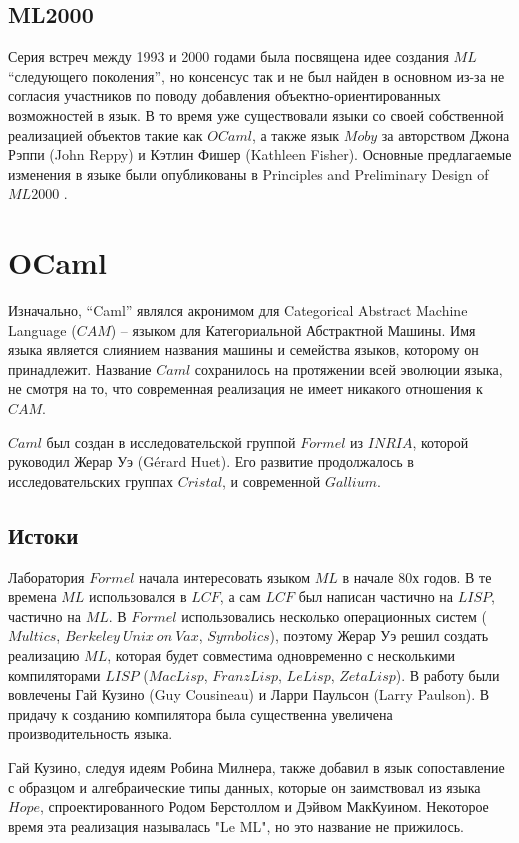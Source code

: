 \documentclass[14pt]{matmex-diploma-custom}
\begin{document}
\subsection{ML2000}
Серия встреч между 1993 и 2000 годами была посвящена идее создания $M\!L$ “следующего поколения”, но консенсус так и не был найден в основном из-за не согласия участников по поводу добавления объектно-ориентированных возможностей в язык. В то время уже существовали языки со своей собственной реализацией объектов такие как $OCaml$, а также язык $Moby$ за авторством Джона Рэппи (John Reppy) и Кэтлин Фишер (Kathleen Fisher). Основные предлагаемые изменения в языке были опубликованы в Principles and Preliminary Design of $ML2000$ \cite{ML2000}. 


\section{OCaml}
Изначально, “Caml” являлся акронимом для Categorical Abstract Machine Language ($CAM$) -- языком для Категориальной Абстрактной Машины. Имя языка является слиянием названия машины и семейства языков, которому он принадлежит. Название $Caml$ сохранилось на протяжении всей эволюции языка, не смотря на то, что современная реализация не имеет никакого отношения к $CAM$.

$Caml$ был создан в исследовательской группой $Formel$ из $INRIA$, которой руководил Жерар Уэ (Gérard Huet). Его развитие продолжалось в исследовательских группах $Cristal$, и современной $Gallium$.

\subsection{Истоки}
Лаборатория $Formel$ начала интересовать языком $M\!L$ в начале 80х годов. В те времена $M\!L$ использовался в $LCF$, а сам $LCF$ был написан частично на $LISP$, частично на $M\!L$. В $Formel$ использовались несколько операционных систем ($Multics$, $Berkeley\ Unix\ on\ Vax$, $Symbolics$), поэтому Жерар Уэ решил создать реализацию $M\!L$, которая будет совместима одновременно с несколькими компиляторами $LISP$ ($MacLisp$, $FranzLisp$, $LeLisp$, $ZetaLisp$). В работу были вовлечены Гай Кузино (Guy Cousineau) и Ларри Паульсон (Larry Paulson). В придачу к созданию компилятора была существенна увеличена производительность языка.

Гай Кузино, следуя идеям Робина Милнера, также добавил в язык сопоставление с образцом и алгебраические типы данных, которые он заимствовал из языка $Hope$, спроектированного Родом Берстоллом и Дэйвом МакКуином. Некоторое время эта реализация называлась "Le ML", но это название не прижилось. 
\end{document}
